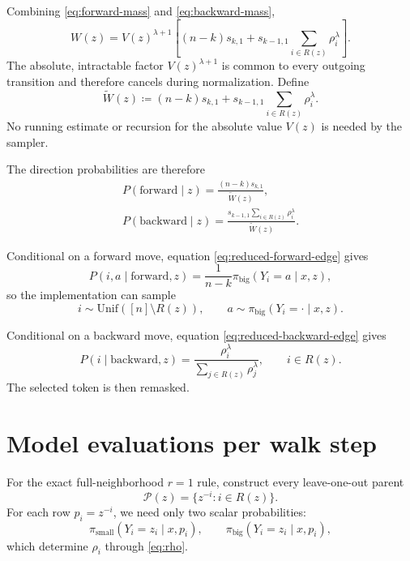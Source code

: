\documentclass[11pt]{article}
\newcommand{\pb}{\pi_{\mathrm{big}}}
\newcommand{\ps}{\pi_{\mathrm{small}}}
\newcommand{\R}{R}
\newcommand{\Wt}{\widetilde W}
\begin{document}
Combining \eqref{eq:forward-mass} and \eqref{eq:backward-mass},
\begin{equation}
W(z)
=
V(z)^{\lambda+1}
\left[
(n-k)s_{k,1}
+
s_{k-1,1}\sum_{i\in\R(z)}\rho_i^\lambda
\right].
\end{equation}
The absolute, intractable factor $V(z)^{\lambda+1}$ is common to every outgoing transition and therefore cancels during normalization. Define
\begin{equation}
\boxed{
\Wt(z)
\coloneqq
(n-k)s_{k,1}
+
s_{k-1,1}\sum_{i\in\R(z)}\rho_i^\lambda
}.
\label{eq:reduced-W}
\end{equation}
No running estimate or recursion for the absolute value $V(z)$ is needed by the sampler.

The direction probabilities are therefore
\begin{align}
\boxed{
P(\mathrm{forward}\mid z)
=
\frac{(n-k)s_{k,1}}{\Wt(z)}
},
\label{eq:p-forward}\\[4pt]
\boxed{
P(\mathrm{backward}\mid z)
=
\frac{s_{k-1,1}\sum_{i\in\R(z)}\rho_i^\lambda}{\Wt(z)}
}.
\label{eq:p-backward}
\end{align}

Conditional on a forward move, equation \eqref{eq:reduced-forward-edge} gives
\begin{equation}
\boxed{
P(i,a\mid \mathrm{forward},z)
=
\frac{1}{n-k}\pb(Y_i=a\mid x,z)
},
\end{equation}
so the implementation can sample
\begin{equation}
i\sim\mathrm{Unif}([n]\setminus\R(z)),
\qquad
a\sim\pb(Y_i=\cdot\mid x,z).
\label{eq:forward-sampling}
\end{equation}

Conditional on a backward move, equation \eqref{eq:reduced-backward-edge} gives
\begin{equation}
\boxed{
P(i\mid \mathrm{backward},z)
=
\frac{\rho_i^\lambda}
{\sum_{j\in\R(z)}\rho_j^\lambda}
},
\qquad i\in\R(z).
\label{eq:backward-sampling}
\end{equation}
The selected token is then remasked.

\section{Model evaluations per walk step}

For the exact full-neighborhood $r=1$ rule, construct every leave-one-out parent
\begin{equation}
\mathcal P(z)=\{z^{-i}:i\in\R(z)\}.
\end{equation}
For each row $p_i=z^{-i}$, we need only two scalar probabilities:
\begin{equation}
\ps(Y_i=z_i\mid x,p_i),
\qquad
\pb(Y_i=z_i\mid x,p_i),
\end{equation}
which determine $\rho_i$ through \eqref{eq:rho}.
\end{document}
